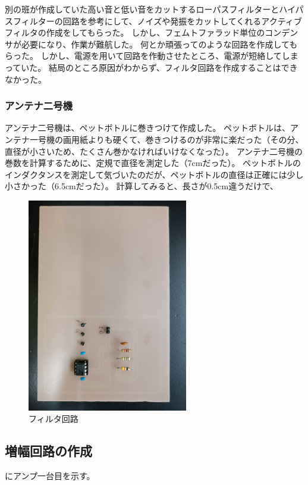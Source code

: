 \documentclass[report.tex]{subfiles}
\begin{document}
別の班が作成していた高い音と低い音をカットするローパスフィルターとハイパスフィルターの回路を参考にして、ノイズや発振をカットしてくれるアクティブフィルタの作成をしてもらった。
しかし、フェムトファラッド単位のコンデンサが必要になり、作業が難航した。
何とか頑張ってのような回路を作成してもらった。
しかし、電源を用いて回路を作動させたところ、電源が短絡してしまっていた。
結局のところ原因がわからず、フィルタ回路を作成することはできなかった。

\subsubsection{アンテナ二号機}

アンテナ二号機は、ペットボトルに巻きつけて作成した。
ペットボトルは、アンテナ一号機の画用紙よりも硬くて、巻きつけるのが非常に楽だった（その分、直径が小さいため、たくさん巻かなければいけなくなった）。
アンテナ二号機の巻数を計算するために、定規で直径を測定した（7cmだった）。
ペットボトルのインダクタンスを測定して気づいたのだが、ペットボトルの直径は正確には少し小さかった（6.5cmだった）。
計算してみると、長さが0.5cm違うだけで、

\begin{figure}[H]
	\centering
	\includegraphics[width=7cm]{use/1.jpg}
	\caption{フィルタ回路}
	\label{fig:filter}
\end{figure}

\subsection{増幅回路の作成}

にアンプ一台目を示す。
\end{document}
